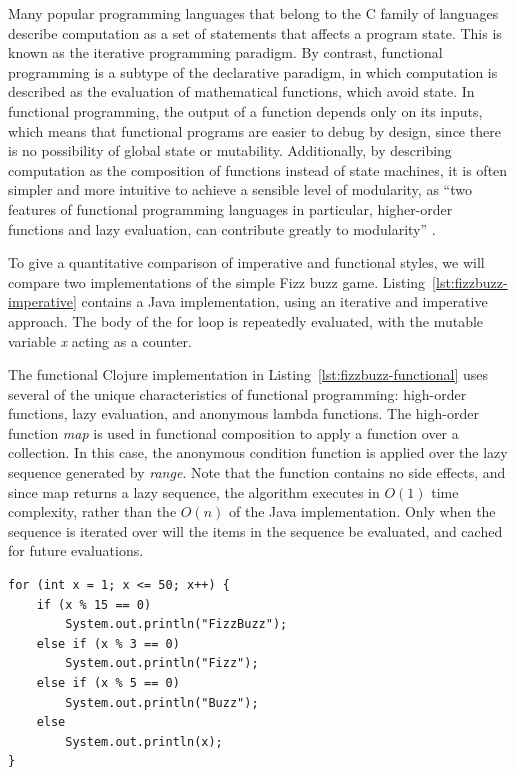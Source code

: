 Many popular programming languages that belong to the C family of
languages describe computation as a set of statements that affects a
program state. This is known as the iterative programming paradigm. By
contrast, functional programming is a subtype of the declarative
paradigm, in which computation is described as the evaluation of
mathematical functions, which avoid state. In functional programming,
the output of a function depends only on its inputs, which means that
functional programs are easier to debug by design, since there is no
possibility of global state or mutability. Additionally, by describing
computation as the composition of functions instead of state machines,
it is often simpler and more intuitive to achieve a sensible level of
modularity, as ``two features of functional programming languages in
particular, higher-order functions and lazy evaluation, can contribute
greatly to modularity'' \cite{hughes1989functional}.

To give a quantitative comparison of imperative and functional styles,
we will compare two implementations of the simple Fizz buzz
game. Listing~\ref{lst:fizzbuzz-imperative} contains a Java
implementation, using an iterative and imperative approach. The body
of the for loop is repeatedly evaluated, with the mutable variable
\textit{x} acting as a counter.

The functional Clojure implementation in
Listing~\ref{lst:fizzbuzz-functional} uses several of the unique
characteristics of functional programming: high-order functions, lazy
evaluation, and anonymous lambda functions. The high-order function
\textit{map} is used in functional composition to apply a function
over a collection. In this case, the anonymous condition function is
applied over the lazy sequence generated by \textit{range}. Note that
the function contains no side effects, and since map returns a lazy
sequence, the algorithm executes in $O(1)$ time complexity, rather
than the $O(n)$ of the Java implementation. Only when the sequence is
iterated over will the items in the sequence be evaluated, and cached
for future evaluations.

\lstset{language=java}
\begin{lstlisting}[label=lst:fizzbuzz-imperative,caption={
      [An imperative implementation of Fizz buzz in Java]
       An imperative implementation of Fizz buzz in Java.}]
for (int x = 1; x <= 50; x++) {
    if (x % 15 == 0)
        System.out.println("FizzBuzz");
    else if (x % 3 == 0)
        System.out.println("Fizz");
    else if (x % 5 == 0)
        System.out.println("Buzz");
    else
        System.out.println(x);
}
\end{lstlisting}

